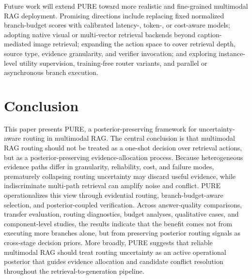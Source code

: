 \documentclass[a4paper,fleqn]{cas-dc}
\begin{document}
Future work will extend PURE toward more realistic and fine-grained multimodal RAG deployment. Promising directions include replacing fixed normalized branch-budget scores with calibrated latency-, token-, or cost-aware models; adopting native visual or multi-vector retrieval backends beyond caption-mediated image retrieval; expanding the action space to cover retrieval depth, source type, evidence granularity, and verifier invocation; and exploring instance-level utility supervision, training-free router variants, and parallel or asynchronous branch execution.

\section{Conclusion}\label{sec:conclusion}

This paper presents PURE, a posterior-preserving framework for uncertainty-aware routing in multimodal RAG. The central conclusion is that multimodal RAG routing should not be treated as a one-shot decision over retrieval actions, but as a posterior-preserving evidence-allocation process. Because heterogeneous evidence paths differ in granularity, reliability, cost, and failure modes, prematurely collapsing routing uncertainty may discard useful evidence, while indiscriminate multi-path retrieval can amplify noise and conflict. PURE operationalizes this view through evidential routing, branch-budget-aware selection, and posterior-coupled verification. Across answer-quality comparisons, transfer evaluation, routing diagnostics, budget analyses, qualitative cases, and component-level studies, the results indicate that the benefit comes not from executing more branches alone, but from preserving posterior routing signals as cross-stage decision priors. More broadly, PURE suggests that reliable multimodal RAG should treat routing uncertainty as an active operational posterior that guides evidence allocation and candidate conflict resolution throughout the retrieval-to-generation pipeline.

\printcredits

%





\end{document}
